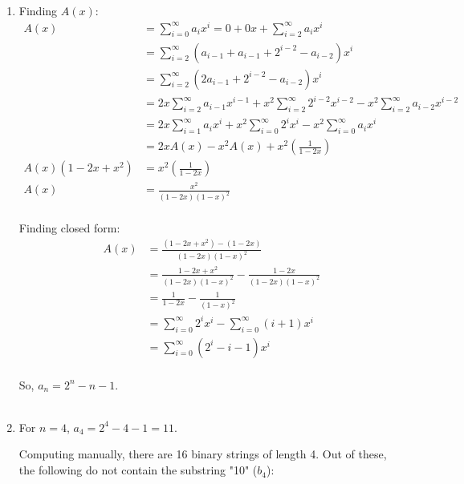 \documentclass[a4paper]{article}
\begin{document}
\begin{enumerate}
\begin{enumerate}
            \item Finding $A(x)$:
            \[
                \begin{split}
                    A(x) &= \sum_{i=0}^{\infty} a_i x^i = 0 + 0x + \sum_{i=2}^{\infty} a_i x^i \\
                    &= \sum_{i=2}^{\infty} (a_{i-1} + a_{i-1} + 2^{i-2} - a_{i-2})x^i \\
                    &= \sum_{i=2}^{\infty} (2a_{i-1} + 2^{i-2} - a_{i-2})x^i \\
                    &= 2x\sum_{i=2}^{\infty} a_{i-1}x^{i-1} + x^2\sum_{i=2}^{\infty} 2^{i-2}x^{i-2} - x^2\sum_{i=2}^{\infty} a_{i-2}x^{i-2} \\
                    &= 2x\sum_{i=1}^{\infty} a_{i}x^{i} + x^2\sum_{i=0}^{\infty} 2^{i}x^{i} - x^2\sum_{i=0}^{\infty} a_{i}x^{i} \\
                    &= 2xA(x) - x^2A(x) + x^2(\frac{1}{1-2x}) \\
                    A(x)(1 - 2x + x^2) &= x^2(\frac{1}{1-2x}) \\
                    A(x) &= \frac{x^2}{(1-2x)(1-x)^2} \\
                \end{split}
            \]

            Finding closed form:
            \[
                \begin{split}
                    A(x) &= \frac{(1 - 2x + x ^2) - (1 - 2x)}{(1-2x)(1-x)^2} \\
                    &= \frac{1 - 2x + x^2}{(1-2x)(1-x)^2} - \frac{1 - 2x}{(1-2x)(1-x)^2} \\
                    &= \frac{1}{1-2x} - \frac{1}{(1-x)^2} \\
                    &= \sum_{i=0}^{\infty} 2^ix^i - \sum_{i=0}^{\infty} (i+1)x^i \\
                    &= \sum_{i=0}^{\infty} (2^i - i - 1)x^i \\
                \end{split}
            \]

            So, $a_n = 2^n - n - 1$. \\ \\

            \item For $n = 4$, $a_4 = 2^4 - 4 - 1 = 11$.
            
            Computing manually, there are 16 binary strings of length 4. Out of these, the following do not contain the substring "10" ($b_4$): \\


\end{enumerate}
\end{enumerate}
\end{document}
